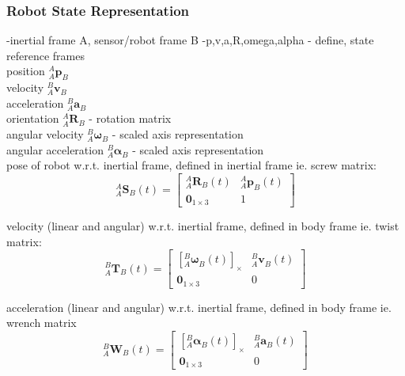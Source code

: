 	
	\subsubsection{Robot State Representation}
		-inertial frame A, sensor/robot frame  B
		-p,v,a,R,omega,alpha - define, state reference frames\\	
		position $^{A}_{A}\mathbf{p}^{}_{B}$\\
		velocity $^{B}_{A}\mathbf{v}^{}_{B}$\\
		acceleration $^{B}_{A}\mathbf{a}^{}_{B}$\\
		orientation $^{A}_{A}\mathbf{R}^{}_{B}$ - rotation matrix\\
		angular velocity $^{B}_{A}\mathbf{\omega}^{}_{B}$ - scaled axis representation\\
		angular acceleration $^{B}_{A}\mathbf{\alpha}^{}_{B}$ - scaled axis representation\\
		
		pose of robot w.r.t. inertial frame, defined in inertial frame ie. screw matrix:
		\begin{equation}
				^{A}_{A}\mathbf{S}^{}_{B}(t) = 
				\begin{bmatrix}
						  ^{A}_{A}\mathbf{R}^{}_{B}(t) 	& 	^{A}_{A}\mathbf{p}^{}_{B}(t)\\
						  \textbf{0}_{1 \times 3} & 1						  
				\end{bmatrix}
		\end{equation}
		
		velocity (linear and angular) w.r.t. inertial frame, defined in body frame ie. twist matrix:
		\begin{equation}
				^{B}_{A}\mathbf{T}^{}_{B}(t) = 
				\begin{bmatrix}
		  {[^{B}_{A}\mathbf{\omega}^{}_{B}(t)]_\times} 	& 	^{B}_{A}\mathbf{v}^{}_{B}(t)\\
		  \textbf{0}_{1 \times 3} & 0						  
				\end{bmatrix}
		\end{equation}
				
		acceleration (linear and angular) w.r.t. inertial frame, defined in body frame ie. wrench matrix
		\begin{equation}
				^{B}_{A}\mathbf{W}^{}_{B}(t) = 
				\begin{bmatrix}
				  {[^{B}_{A}\mathbf{\alpha}^{}_{B}(t)]_\times} 	& 	^{B}_{A}\mathbf{a}^{}_{B}(t)\\
				  \textbf{0}_{1 \times 3} & 0						  
				\end{bmatrix}
		\end{equation}
		

